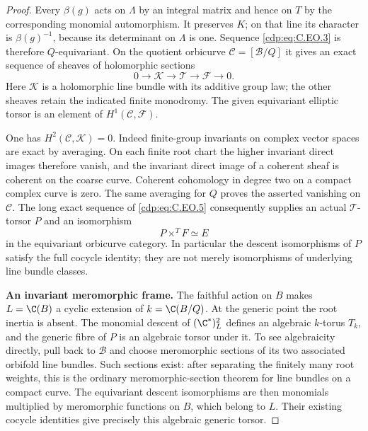 \begin{proof}
Every $\beta(g)$ acts on $\Lambda$ by an integral
matrix and hence on $T$ by the corresponding
monomial automorphism. It preserves $K$; on
that line its character is $\beta(g)^{-1}$,
because its determinant on $\Lambda$ is one.
Sequence \eqref{cdp:eq:C.EO.3} is therefore $Q$-equivariant.
On the quotient orbicurve $\mathcal C=[\mathcal B/Q]$
it gives an exact sequence of sheaves of
holomorphic sections
\[
 0\longrightarrow\mathcal K\longrightarrow
 \mathcal T\longrightarrow\mathcal F\longrightarrow0.
                                                               \tag{C.EO.5}\label{cdp:eq:C.EO.5}
\]
Here $\mathcal K$ is a holomorphic line bundle
with its additive group law; the other sheaves
retain the indicated finite monodromy. The given
equivariant elliptic torsor is an element of
$H^1(\mathcal C,\mathcal F)$.

One has $H^2(\mathcal C,\mathcal K)=0$.
Indeed finite-group invariants on complex vector
spaces are exact by averaging. On each finite
root chart the higher invariant direct images
therefore vanish, and the invariant direct image
of a coherent sheaf is coherent on the coarse
curve. Coherent cohomology in degree two on a
compact complex curve is zero. The same averaging
for $Q$ proves the asserted vanishing on
$\mathcal C$. The long exact sequence of
\eqref{cdp:eq:C.EO.5} consequently supplies an actual
$\mathcal T$-torsor $P$ and an isomorphism
\[
                  P\mathbin{\times^{T}}F
                           \simeq E                 \tag{C.EO.6}\label{cdp:eq:C.EO.6}
\]
in the equivariant orbicurve category. In
particular the descent isomorphisms of $P$
satisfy the full cocycle identity; they are
not merely isomorphisms of underlying line
bundle classes.

\par\medskip\noindent\textbf{An invariant meromorphic frame.}
The faithful action on $B$ makes
$L=\C(B)$ a cyclic extension of
$k=\C(B/Q)$. At the generic point the root
inertia is absent. The monomial descent of
$(\C^*)^2_L$ defines an algebraic $k$-torus
$T_k$, and the generic fibre of $P$ is an
algebraic torsor under it. To see algebraicity
directly, pull back to $\mathcal B$ and choose
meromorphic sections of its two associated
orbifold line bundles. Such sections exist:
after separating the finitely many root weights,
this is the ordinary meromorphic-section theorem
for line bundles on a compact curve. The
equivariant descent isomorphisms are then
monomials multiplied by meromorphic functions
on $B$, which belong to $L$. Their existing
cocycle identities give precisely this algebraic
generic torsor.


\end{proof}
